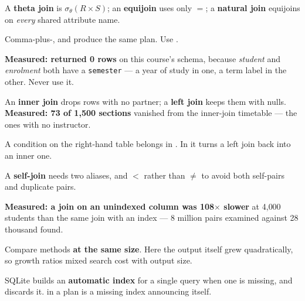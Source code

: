 \begin{chaptersummary}
\begin{tight}
  \item A \textbf{theta join} is $\sigma_\theta(R \times S)$; an
        \textbf{equijoin} uses only $=$; a \textbf{natural join} equijoins on
        \emph{every} shared attribute name.
  \item Comma-plus-,  and  produce the same plan. Use .
  \item \textbf{Measured:  returned 0 rows} on this
        course's schema, because \textit{student} and \textit{enrolment} both
        have a \texttt{semester} --- a year of study in one, a term label in
        the other. Never use it.
  \item An \textbf{inner join} drops rows with no partner; a \textbf{left
        join} keeps them with nulls. \textbf{Measured: 73 of 1{,}500 sections}
        vanished from the inner-join timetable --- the ones with no instructor.
  \item A condition on the right-hand table belongs in . In
         it turns a left join back into an inner one.
  \item A \textbf{self-join} needs two aliases, and $<$ rather than $\neq$ to
        avoid both self-pairs and duplicate pairs.
  \item \textbf{Measured: a join on an unindexed column was 108$\times$ slower}
        at 4{,}000 students than the same join with an index --- 8 million
        pairs examined against 28 thousand found.
  \item Compare methods \textbf{at the same size}. Here the output itself grew
        quadratically, so growth ratios mixed search cost with output size.
  \item SQLite builds an \textbf{automatic index} for a single query when one
        is missing, and discards it.  in a plan is a missing
        index announcing itself.
\end{tight}
\end{chaptersummary}

